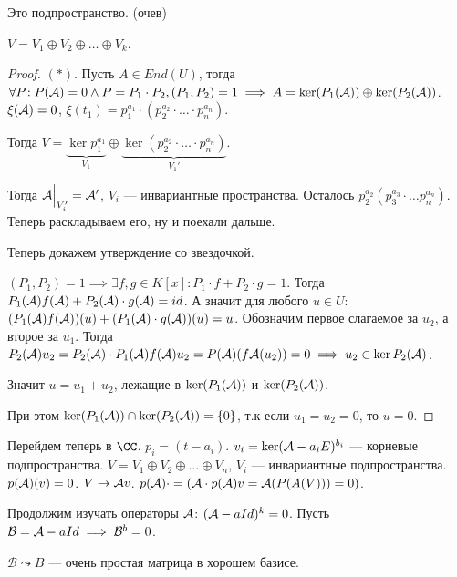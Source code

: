 \begin{remark}
    Это подпространство. (очев)
\end{remark}

\begin{theorem}
    $V = V_1 \oplus V_2 \oplus \ldots \oplus V_k$.
\end{theorem}
\begin{proof}
    $(*)$. Пусть $A \in End(U)$, тогда $\forall P\!: P(\mathcal{A}) = 0 \land P = P_1 \cdot P_2, (P_1, P_2) = 1 \implies A = \ker(P_1(\mathcal{A})) \oplus \ker(P_2(\mathcal{A}))$. $\xi(\mathcal{A}) = 0$, $\xi(t_1) = p_1^{a_1} \cdot (p_2^{a_2} \cdot \ldots \cdot p_n^{a_n})$. 

    Тогда $V = \underbrace{\ker p_1^{a_1}}_{V_1} \oplus \underbrace{\ker(p_2^{a_2} \cdot \ldots \cdot p_n^{a_n})}_{V_1'}$. 

    Тогда $\mathcal{A}\Big|_{V'_i} = \mathcal{A}'$,  $V_i$ --- инвариантные пространства.  Осталось $p_2^{a_2} (p_3^{a_3} \cdot \ldots p_n^{a_n})$. Теперь раскладываем его, ну и поехали дальше.

    Теперь докажем утверждение со звездочкой.

    $(P_1, P_2) = 1 \implies \exists f, g \in K[x]\!: P_1 \cdot f + P_2 \cdot g = 1$. Тогда $P_1(\mathcal{A}) f(\mathcal{A}) + P_2(\mathcal{A})\cdot g(\mathcal{A}) = id$. А значит для любого $u \in U\!:$  $(P_1(\mathcal{A})f(\mathcal{A}))(u) + (P_1(\mathcal{A}) \cdot g(\mathcal{A}))(u) = u$. Обозначим первое слагаемое за $u_2$, а второе за $u_1$. Тогда $P_2(\mathcal{A}) u_2 = P_2(\mathcal{A}) \cdot P_1(\mathcal{A}) f(\mathcal{A})u_2 = P(\mathcal{A})(f \mathcal{A}(u_2)) = 0 \implies u_2 \in \ker P_2(\mathcal{A})$. 

    Значит $u = u_1 + u_2$, лежащие в $\ker(P_1(\mathcal{A}))$ и $\ker(P_2(\mathcal{A}))$.

    При этом $\ker(P_1(\mathcal{A})) \cap \ker(P_2(\mathcal{A})) = \{0\}$, т.к если $u_1=u_2=0$, то $u=0$.
\end{proof}

Перейдем теперь в $\CC$.  $p_i = (t-a_i)$.  $v_i = \ker(\mathcal{A} - a_iE)^{b_i}$ --- корневые подпространства. $V = V_1 \oplus V_2 \oplus \ldots \oplus V_n$, $V_i$ --- инвариантные подпространства.  $p(\mathcal{A})(v) = 0$.  $V \to \mathcal{A} v$.  $p(\mathcal{A}) \cdot = (\mathcal{A} \cdot p(\mathcal{A})v = \mathcal{A}(P(A(V))) = 0)$. 

Продолжим изучать операторы $\mathcal{A}$: $(\mathcal{A} - aId)^k = 0$. Пусть  $\mathcal{B} = \mathcal{A} - aId \implies \mathcal{B}^b = 0$.

$\mathcal{B} \leadsto B$ --- очень простая матрица в хорошем базисе. 


